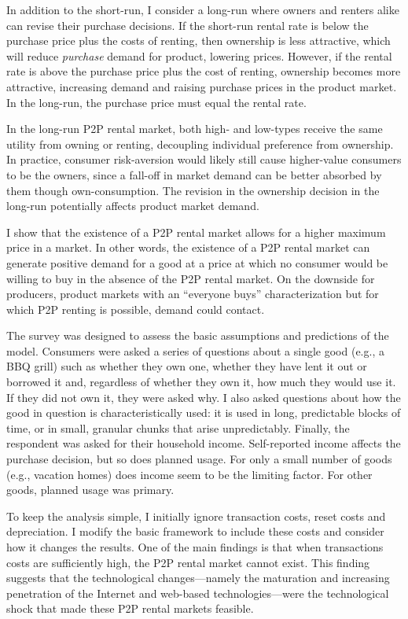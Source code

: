\documentclass[11pt]{article}
\begin{document}
In addition to the short-run, I consider a long-run where owners and renters alike can revise their purchase decisions. 
If the short-run rental rate is below the purchase price plus the costs of renting, then ownership is less attractive, which will reduce \emph{purchase} demand for product, lowering prices. 
However, if the rental rate is above the purchase price plus the cost of renting, ownership becomes more attractive, increasing demand and raising purchase prices in the product market. 
In the long-run, the purchase price must equal the rental rate.  

In the long-run P2P rental market, both high- and low-types receive the same utility from owning or renting, decoupling individual preference from ownership. 
In practice, consumer risk-aversion would likely still cause higher-value consumers to be the owners, since a fall-off in market demand can be better absorbed by them though own-consumption. 
The revision in the ownership decision in the long-run potentially affects product market demand. 

I show that the existence of a P2P rental market allows for a higher maximum price in a market. 
In other words, the existence of a P2P rental market can generate positive demand for a good at a price at which no consumer would be willing to buy in the absence of the P2P rental market. 
On the downside for producers, product markets with an ``everyone buys'' characterization but for which P2P renting is possible, demand could contact.   

The survey was designed to assess the basic assumptions and predictions of the model.
Consumers were asked a series of questions about a single good (e.g., a BBQ grill) such as whether they own one, whether they have lent it out or borrowed it and, regardless of whether they own it, how much they would use it. 
If they did not own it, they were asked why. 
I also asked questions about how the good in question is characteristically used: it is used in long, predictable blocks of time, or in small, granular chunks that arise unpredictably. 
Finally, the respondent was asked for their household income.  
Self-reported income affects the purchase decision, but so does planned usage. 
For only a small number of goods (e.g., vacation homes) does income seem to be the limiting factor. 
For other goods, planned usage was primary.  

To keep the analysis simple, I initially ignore transaction costs, reset costs and depreciation. 
I modify the basic framework to include these costs and consider how it changes the results. 
One of the main findings is that when transactions costs are sufficiently high, the P2P rental market cannot exist. 
This finding suggests that the technological changes---namely the maturation and increasing penetration of the Internet and web-based technologies---were the technological shock that made these P2P rental markets feasible. 
\end{document}

